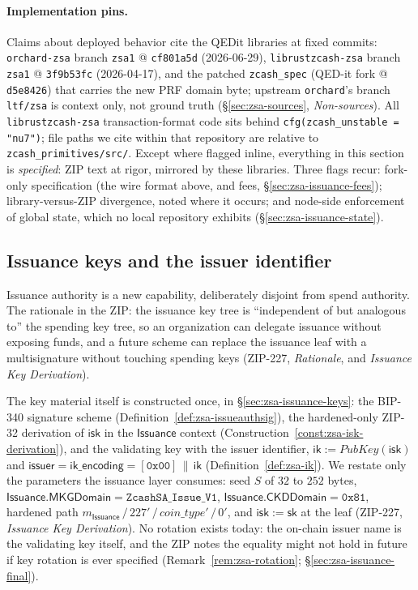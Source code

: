 \documentclass[11pt,a4paper]{article}
\theoremstyle{definition}
\begin{document}
\paragraph{Implementation pins.} Claims about deployed behavior cite the
QEDit libraries at fixed commits: \texttt{orchard-zsa} branch
\texttt{zsa1} @ \texttt{cf801a5d} (2026-06-29), \texttt{librustzcash-zsa}
branch \texttt{zsa1} @ \texttt{3f9b53fc} (2026-04-17), and the patched
\texttt{zcash\_spec} (QED-it fork @ \texttt{d5e8426}) that carries the new
PRF domain byte; upstream \texttt{orchard}'s branch \texttt{ltf/zsa} is
context only, not ground truth (\S\ref{sec:zsa-sources},
\emph{Non-sources}). All \texttt{librustzcash-zsa}
transaction-format code sits behind
\texttt{cfg(zcash\_unstable = "nu7")}; file paths we cite within that
repository are relative to \texttt{zcash\_primitives/src/}. Except
where flagged inline,
everything in this section is \emph{specified}: ZIP text at rigor,
mirrored by these libraries. Three flags recur: fork-only specification
(the wire format above, and fees, \S\ref{sec:zsa-issuance-fees});
library-versus-ZIP divergence, noted where it occurs; and node-side
enforcement of global state, which no local repository exhibits
(\S\ref{sec:zsa-issuance-state}).

\subsection{Issuance keys and the issuer identifier}%
\label{sec:zsa-issuer-keys}

Issuance authority is a new capability, deliberately disjoint from spend
authority. The rationale in the ZIP: the issuance key tree is
``independent of but analogous to'' the spending key tree, so an
organization can delegate issuance without exposing funds, and a future
scheme can replace the issuance leaf with a multisignature without
touching spending keys (ZIP-227, \emph{Rationale}, and \emph{Issuance Key
Derivation}).

The key material itself is constructed once, in
\S\ref{sec:zsa-issuance-keys}: the BIP-340 signature scheme
(Definition~\ref{def:zsa-issueauthsig}), the hardened-only ZIP-32
derivation of $\mathsf{isk}$ in the $\mathsf{Issuance}$ context
(Construction~\ref{const:zsa-isk-derivation}), and the validating key with
the issuer identifier, $\mathsf{ik} := \mathit{PubKey}(\mathsf{isk})$ and
$\mathsf{issuer} = \mathsf{ik\_encoding} = [\mathtt{0x00}] \,\|\,
\mathsf{ik}$ (Definition~\ref{def:zsa-ik}). We restate only the parameters
the issuance layer consumes: seed $S$ of $32$ to $252$ bytes,
$\mathsf{Issuance.MKGDomain} = \texttt{ZcashSA\_Issue\_V1}$,
$\mathsf{Issuance.CKDDomain} = \mathtt{0x81}$, hardened path
$m_{\mathsf{Issuance}} \,/\, 227' \,/\, \mathit{coin\_type}' \,/\, 0'$,
and $\mathsf{isk} := \mathsf{sk}$ at the leaf (ZIP-227, \emph{Issuance Key
Derivation}). No rotation exists today: the on-chain issuer name is the
validating key itself, and the ZIP notes the equality might not hold in
future if key rotation is ever specified
(Remark~\ref{rem:zsa-rotation}; \S\ref{sec:zsa-issuance-final}).
\end{document}
